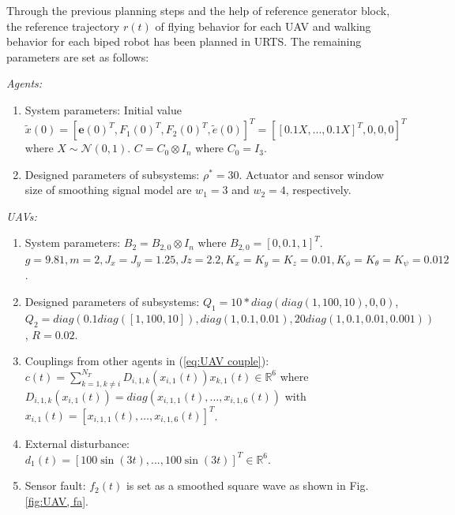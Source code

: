 \documentclass{ieeeaccess}
\begin{document}
Through the previous planning steps and the help of reference generator block, the reference trajectory $r(t)$ of flying behavior for each UAV and walking behavior for each biped robot has been planned in URTS. The remaining parameters are set as follows:

\textit{Agents:}\begin{enumerate}
    \item System parameters:
    Initial value $\tilde{x}(0) = [\pmb{e}(0)^T\mathbin{,} F_1(0)^T\mathbin{,} F_2(0)^T, \tilde{e}(0)]^T = [[0.1X, ..., 0.1X]^T, 0, 0, 0]^T$ where $X \sim \mathcal{N}(0, 1)$. $C = C_0 \otimes I_n$ where $C_0 = I_3$.
    \item Designed parameters of subsystems: $\rho^*=30$. Actuator and sensor window size of smoothing signal model are $w_1=3$ and $w_2=4$, respectively.
\end{enumerate}

\textit{UAVs:}\begin{enumerate}
    \item System parameters:
    $B_2=B_{2,0}\otimes I_n$ where $B_{2,0} = [0, 0.1, 1]^T$.
    $g = 9.81, m = 2,
    J_x = J_y = 1.25, Jz = 2.2,
    K_x = K_y = K_z = 0.01,
    K_\phi = K_\theta = K_\psi = 0.012$.

    \item Designed parameters of subsystems: 
    $Q_1 = 10*diag(diag(1\mathbin{,} 100\mathbin{,} 10)\mathbin{,} 0\mathbin{,} 0)$, 
    $Q_2 = diag(0.1diag([1\mathbin{,} 100\mathbin{,} 10])\mathbin{,} diag(1,0.1, 0.01)\mathbin{,} 20diag(1, 0.1, 0.01\mathbin{,} 0.001))$, 
    $R = 0.02$.

    \item Couplings from other agents in (\ref{eq:UAV couple}):
    \\$c(t) = \sum_{k = 1, k \neq i}^{N_T}D_{i, 1, k}(x_{i, 1}(t))x_{k, 1}(t)\in\mathbb{R}^6$ where $D_{i, 1, k}(x_{i, 1}(t)) = diag(x_{i, 1, 1}(t)\mathbin{,}\dots\mathbin{,}x_{i, 1, 6}(t))$ with $x_{i, 1}(t) = [x_{i, 1, 1}(t)\mathbin{,}\dots\mathbin{,}x_{i, 1, 6}(t)]^T$.
    \item External disturbance:
    \\ $d_1(t) = [100\sin(3t)\mathbin{,} ...\mathbin{,} 100\sin(3t)]^T\in\mathbb{R}^6$.
    \item Sensor fault: $f_2(t)$ is set as a smoothed square wave as shown in Fig. \ref{fig:UAV, fa}.
\end{enumerate}
\end{document}
